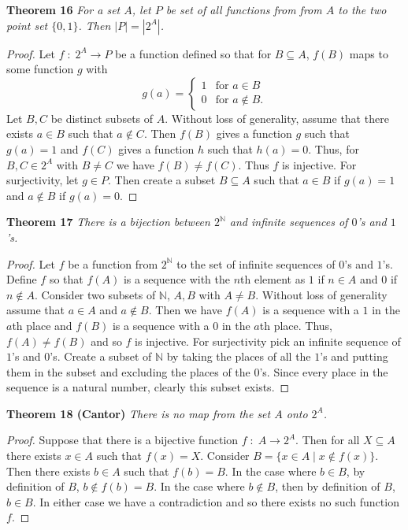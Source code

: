 \documentclass{article}
\begin{document}
\begin{flushleft}
\textbf{Theorem 16}
\textsl{For a set $A$, let $P$ be set of all functions from from $A$ to the two point set $\{0,1\}$.  Then $|P|=|2^A|$.}
\begin{proof}
Let $f \; : \; 2^A \rightarrow P$ be a function defined so that for $B \subseteq A$, $f(B)$ maps to some function $g$ with
\[
g(a)=
\begin{cases}
1 & \text{for $a \in B$} \\
0 & \text{for $a \notin B$}.
\end{cases}
\]
Let $B,C$ be distinct subsets of $A$. Without loss of generality, assume that there exists $a \in B$ such that $a \notin C$. Then $f(B)$ gives a function $g$ such that $g(a) = 1$ and $f(C)$ gives a function $h$ such that $h(a)=0$. Thus, for $B,C \in 2^A$ with $B \neq C$ we have $f(B) \neq f(C)$. Thus $f$ is injective. For surjectivity, let $g \in P$. Then create a subset $B \subseteq A$ such that $a \in B$ if $g(a)=1$ and $a \notin B$ if $g(a)=0$.
\end{proof}

\textbf{Theorem 17}
\textsl{There is a bijection between $2^{\mathbb{N}}$ and infinite sequences of $0$'s and $1$'s.}
\begin{proof}
Let $f$ be a function from $2^{\mathbb{N}}$ to the set of infinite sequences of $0$'s and $1$'s. Define $f$ so that $f(A)$ is a sequence with the $n$th element as $1$ if $n \in A$ and $0$ if $n \notin A$. Consider two subsets of $\mathbb{N}$, $A,B$ with $A \neq B$. Without loss of generality assume that $a \in A$ and $a \notin B$. Then we have $f(A)$ is a sequence with a $1$ in the $a$th place and $f(B)$ is a sequence with a $0$ in the $a$th place. Thus, $f(A) \neq f(B)$ and so $f$ is injective. For surjectivity pick an infinite sequence of $1$'s and $0$'s. Create a subset of $\mathbb{N}$ by taking the places of all the $1$'s and putting them in the subset and excluding the places of the $0$'s. Since every place in the sequence is a natural number, clearly this subset exists.
\end{proof}

\textbf{Theorem 18 (Cantor)}
\textsl{There is no map from the set $A$ onto $2^A$.}
\begin{proof}
Suppose that there is a bijective function $f \; : \; A \rightarrow 2^A$. Then for all $X \subseteq A$ there exists $x \in A$ such that $f(x) = X$. Consider $B = \{ x \in A \mid x \notin f(x) \}$. Then there exists $b \in A$ such that $f(b) = B$. In the case where $b \in B$, by definition of $B$, $b \notin f(b) = B$. In the case where $b \notin B$, then by definition of $B$, $b \in B$. In either case we have a contradiction and so there exists no such function $f$.
\end{proof}


\end{flushleft}
\end{document}
